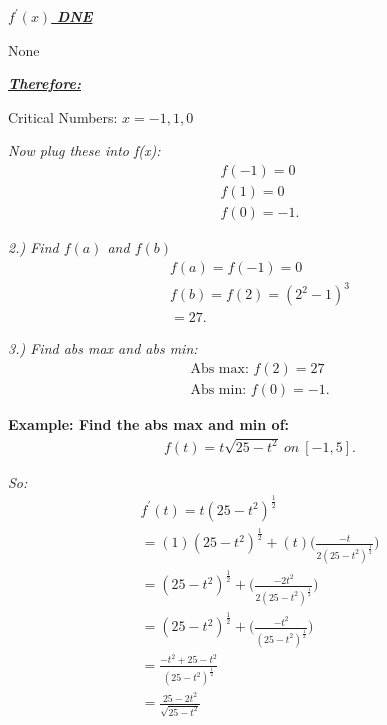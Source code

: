\documentclass{report}
\begin{document}
    \bigbreak \noindent 
    \textbf{\textit{\underline{$f^{\prime}(x)$ DNE}}}
    \begin{center}
      None
    \end{center}

    \bigbreak \noindent 
    \textbf{\textit{\underline{Therefore:}}}
    \begin{center}
      Critical Numbers: $x=-1,1,0$
    \end{center}

    \bigbreak \noindent \bigbreak \noindent 
    \textit{Now plug these into f(x):}
    \begin{align*}
      f(-1) = 0 \\
      f(1) = 0 \\
      f(0) = -1
    .\end{align*}

    \pagebreak \bigbreak \noindent
    \textit{2.) Find $f(a)$ and $f(b)$}
    \begin{align*}
      f(a) = f(-1) = 0 \\
      f(b) = f(2) = (2^{2} -1)^{3} \\
      = 27
    .\end{align*}

    \bigbreak \noindent 
    \textit{3.) Find abs max and abs min:}
    \begin{align*}
      \text{Abs max: } f(2) = 27 \\
      \text{Abs min: } f(0) = -1
    .\end{align*}

    \bigbreak \noindent 
    \begin{mdframed}
      \textbf{Example: Find the abs max and min of:}
      \begin{align*}
        f(t) = t\sqrt{25-t^{2}}\ on\ [-1,5]
      .\end{align*}
    \end{mdframed}

    \bigbreak \noindent
    \textit{So:}
    \begin{align*}
      f^{\prime}(t) = t(25-t^{2})^{\frac{1}{2}} \\
      = (1)(25-t^{2})^{\frac{1}{2}} + (t)\bigg(\frac{-t}{2(25-t^{2})^{\frac{1}{2}}}\bigg) \\
      = (25-t^{2})^{\frac{1}{2}} + \bigg(\frac{-2t^{2}}{2(25-t^{2})^{\frac{1}{2}}}\bigg) \\
      = (25-t^{2})^{\frac{1}{2}} + \bigg(\frac{-t^{2}}{(25-t^{2})^{\frac{1}{2}}}\bigg) \\
      =\frac{-t^{2} + 25 - t^{2}}{(25-t^{2})^{\frac{1}{2}}} \\
      = \frac{25-2t^{2}}{\sqrt{25-t^{2}}}
    \end{align*}
\end{document}
